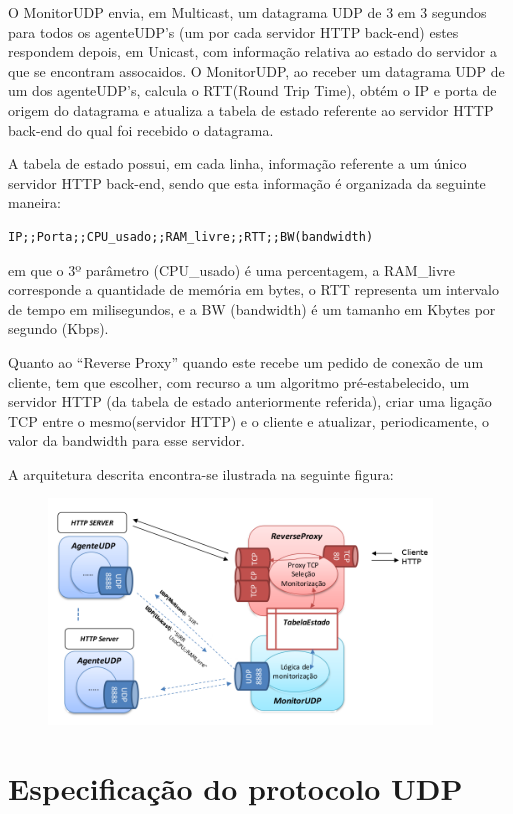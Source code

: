 \documentclass{article}
\begin{document}
O MonitorUDP envia, em Multicast, um datagrama UDP de 3 em 3 segundos para todos os agenteUDP's (um por cada servidor HTTP back-end) estes respondem depois, em Unicast, com informação relativa ao estado do servidor a que se encontram assocaidos. O MonitorUDP, ao receber um datagrama UDP de um dos agenteUDP's, calcula o RTT(Round Trip Time), obtém o IP e porta de origem do datagrama e atualiza a tabela de estado referente ao servidor HTTP back-end do qual foi recebido o datagrama.

A tabela de estado possui, em cada linha, informação referente a um único servidor HTTP back-end, sendo que esta informação é organizada da seguinte maneira:

\begin{verbatim}
IP;;Porta;;CPU_usado;;RAM_livre;;RTT;;BW(bandwidth)
\end{verbatim}
em que o 3º parâmetro (CPU\_usado) é uma percentagem, a RAM\_livre corresponde a quantidade de memória em bytes, o RTT representa um intervalo de tempo em milisegundos, e a BW (bandwidth) é um tamanho em Kbytes por segundo (Kbps).

Quanto ao ``Reverse Proxy'' quando este recebe um pedido de conexão de um cliente, tem que escolher, com recurso a um algoritmo pré-estabelecido,  um servidor HTTP (da tabela de estado anteriormente referida), criar uma ligação TCP entre o mesmo(servidor HTTP) e o cliente e atualizar, periodicamente, o valor da bandwidth para esse servidor.

A arquitetura descrita encontra-se ilustrada na seguinte figura:
\begin{figure}[H]
	\centering
	\includegraphics[height=6cm]{arquitetura.png}
\end{figure}

\section{Especificação do protocolo UDP}
\end{document}
